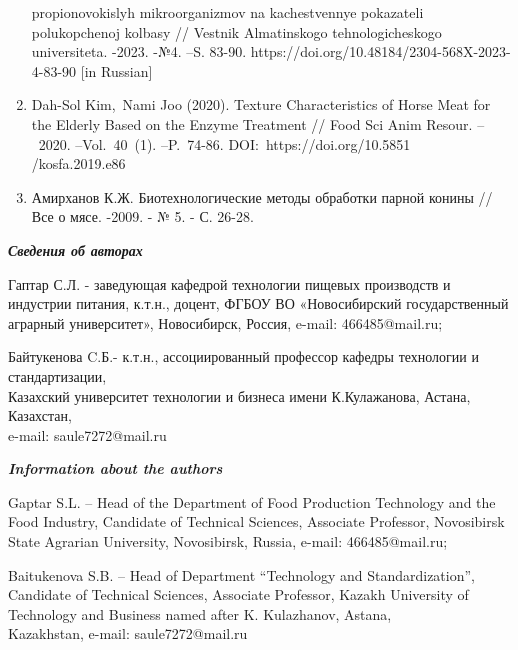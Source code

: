\begin{noparindent}
\begin{enumerate}
  propionovokislyh mikroorganizmov na kachestvennye pokazateli
  polukopchenoj kolbasy // Vestnik Almatinskogo tehnologicheskogo
  universiteta. -2023. -№4. --S. 83-90.
  https://doi.org/10.48184/2304-568X-2023-4-83-90 {[}in Russian{]}
\item
  Dah-Sol Kim,~Nami Joo (2020). Texture Characteristics of Horse Meat
  for the Elderly Based on the Enzyme Treatment // Food Sci Anim Resour.
  --~2020. --Vol.~40~(1). --P.~74-86. DOI:~https://doi.org/10.5851\\/kosfa.2019.e86
\item
  Амирханов К.Ж. Биотехнологические методы обработки парной конины //
  Все о мясе. -2009. - № 5. - С. 26-28.
\end{enumerate}
\end{noparindent}

\emph{{\bfseries Сведения об авторах}}
\begin{noparindent}

Гаптар С.Л. - заведующая кафедрой технологии пищевых производств и
индустрии питания, к.т.н., доцент, ФГБОУ ВО «Новосибирский
государственный аграрный университет», Новосибирск, Россия, e-mail:
466485@mail.ru;

Байтукенова C.Б.- к.т.н., ассоциированный профессор кафедры технологии и
стандартизации, \\Казахский университет технологии и бизнеса имени
К.Кулажанова, Астана, Казахстан, \\e-mail: saule7272@mail.ru
\end{noparindent}

\emph{{\bfseries Information about the authors}}
\begin{noparindent}

Gaptar S.L. -- Head of the Department of Food Production Technology and
the Food Industry, Candidate of Technical Sciences, Associate Professor,
Novosibirsk State Agrarian University, Novosibirsk, Russia, e-mail:
466485@mail.ru;

Baitukenova S.B. -- Head of Department ``Technology and
Standardization'', Candidate of Technical Sciences, Associate Professor,
Kazakh University of Technology and Business named after K. Kulazhanov,
Astana,\\Kazakhstan, e-mail: saule7272@mail.ru
\end{noparindent}

